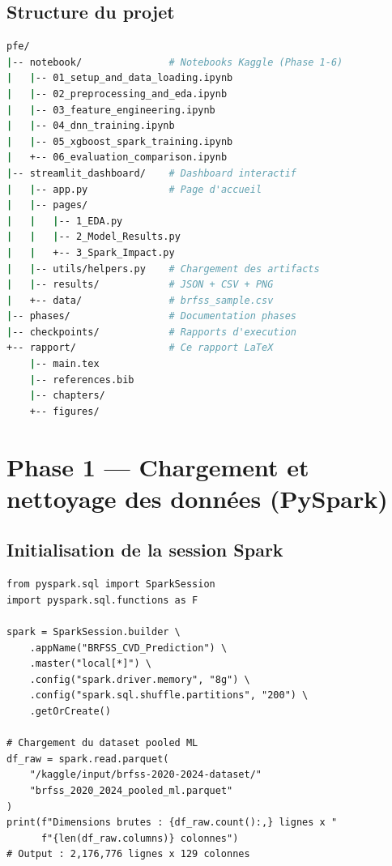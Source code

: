 \subsection{Structure du projet}

\begin{lstlisting}[language=bash, caption=Structure du projet, label=lst:structure, style=pythonstyle]
pfe/
|-- notebook/               # Notebooks Kaggle (Phase 1-6)
|   |-- 01_setup_and_data_loading.ipynb
|   |-- 02_preprocessing_and_eda.ipynb
|   |-- 03_feature_engineering.ipynb
|   |-- 04_dnn_training.ipynb
|   |-- 05_xgboost_spark_training.ipynb
|   +-- 06_evaluation_comparison.ipynb
|-- streamlit_dashboard/    # Dashboard interactif
|   |-- app.py              # Page d'accueil
|   |-- pages/
|   |   |-- 1_EDA.py
|   |   |-- 2_Model_Results.py
|   |   +-- 3_Spark_Impact.py
|   |-- utils/helpers.py    # Chargement des artifacts
|   |-- results/            # JSON + CSV + PNG
|   +-- data/               # brfss_sample.csv
|-- phases/                 # Documentation phases
|-- checkpoints/            # Rapports d'execution
+-- rapport/                # Ce rapport LaTeX
    |-- main.tex
    |-- references.bib
    |-- chapters/
    +-- figures/
\end{lstlisting}

\section{Phase 1 --- Chargement et nettoyage des données (PySpark)}

\subsection{Initialisation de la session Spark}

\begin{lstlisting}[caption=Initialisation de Spark, label=lst:spark_init]
from pyspark.sql import SparkSession
import pyspark.sql.functions as F

spark = SparkSession.builder \
    .appName("BRFSS_CVD_Prediction") \
    .master("local[*]") \
    .config("spark.driver.memory", "8g") \
    .config("spark.sql.shuffle.partitions", "200") \
    .getOrCreate()

# Chargement du dataset pooled ML
df_raw = spark.read.parquet(
    "/kaggle/input/brfss-2020-2024-dataset/"
    "brfss_2020_2024_pooled_ml.parquet"
)
print(f"Dimensions brutes : {df_raw.count():,} lignes x "
      f"{len(df_raw.columns)} colonnes")
# Output : 2,176,776 lignes x 129 colonnes
\end{lstlisting}

